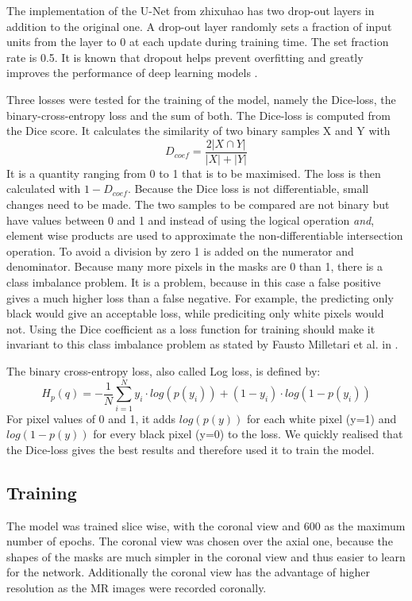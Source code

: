 \documentclass{article}
\begin{document}
The implementation of the U-Net from zhixuhao has two drop-out layers in addition to the original one.
A drop-out layer randomly sets a fraction of input units from the layer to 0 at each update during training time.
The set fraction rate is 0.5.
It is known that dropout helps prevent overfitting and greatly improves the performance of deep learning models \cite{srivastava_dropout:_nodate}.

Three losses were tested for the training of the model, namely the Dice-loss, the binary-cross-entropy loss and the sum of both.
The Dice-loss is computed from the Dice score. It calculates the similarity of two binary samples X and Y with
$$D_{coef} = \frac{2|X\cap Y|}{|X|+|Y|}$$
It is a quantity ranging from 0 to 1 that is to be maximised.
The loss is then calculated with $1-D_{coef}$.
Because the Dice loss is not differentiable, small changes need to be made.
The two samples to be compared are not binary but have values between 0 and 1 and instead of using the logical operation \textit{and}, element wise products are used to approximate the non-differentiable intersection operation.
To avoid a division by zero 1 is added on the numerator and denominator.
Because many more pixels in the masks are 0 than 1, there is a class imbalance problem.
It is a problem, because in this case a false positive gives a much higher loss than a false negative.
For example, the predicting only black would give an acceptable loss, while prediciting only white pixels would not.
Using the Dice coefficient as a loss function for training should make it invariant to this class imbalance problem as stated by Fausto Milletari et al. in \cite{milletari_v-net:_2016}.

The binary cross-entropy loss, also called Log loss, is defined by:
$$H_p (q) = -\frac{1}{N} \sum ^N _{i=1} y_i \cdot log(p(y_i))+(1-y_i) \cdot log(1-p(y_i))$$
For pixel values of 0 and 1, it adds $log(p(y))$ for each white pixel (y=1) and $log(1-p(y))$ for every black pixel (y=0) to the loss.
We quickly realised that the Dice-loss gives the best results and therefore used it to train the model. 

\subsection{Training}
The model was trained slice wise, with the coronal view and 600 as the maximum number of epochs.
The coronal view was chosen over the axial one, because the shapes of the masks are much simpler in the coronal view and thus easier to learn for the network.
Additionally the coronal view has the advantage of higher resolution as the MR images were recorded coronally.
\end{document}
